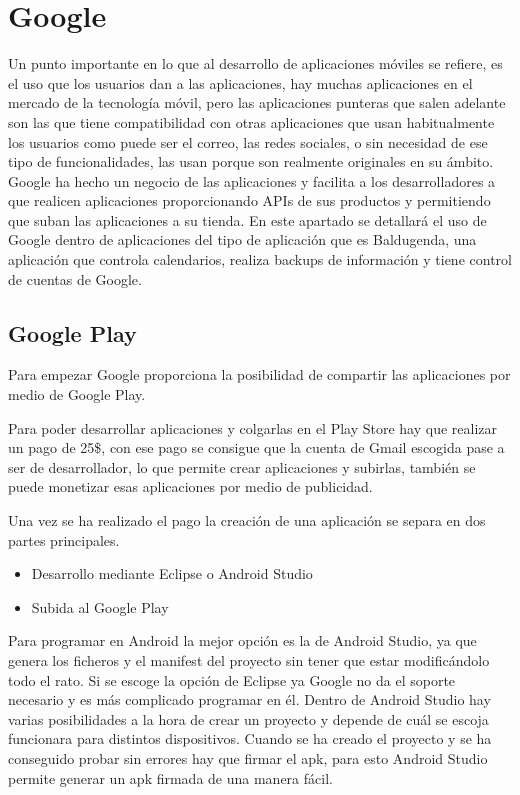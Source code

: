 \section{Google}
\label{secc:google}

Un punto importante en lo que al desarrollo de aplicaciones móviles se refiere, es el uso que los usuarios dan a las aplicaciones, hay muchas aplicaciones en el mercado de la tecnología móvil, pero las aplicaciones punteras que salen adelante son las que tiene compatibilidad con otras aplicaciones que usan habitualmente los usuarios como puede ser el correo, las redes sociales, o sin necesidad de ese tipo de funcionalidades, las usan porque son realmente originales en su ámbito.
Google ha hecho un negocio de las aplicaciones y facilita a los desarrolladores a que  realicen aplicaciones proporcionando APIs de sus productos y permitiendo que suban las aplicaciones a su tienda.
En este apartado se detallará el uso de Google dentro de aplicaciones del tipo de aplicación que es Baldugenda, una aplicación que controla calendarios, realiza backups de información  y tiene control de cuentas de Google.

\subsection{Google Play}
\label{subsecc:Google Play}

Para empezar Google proporciona la posibilidad de compartir  las aplicaciones por medio de Google Play.

Para poder desarrollar aplicaciones y colgarlas en el Play Store hay que realizar un pago de 25\$, con ese pago se consigue que la cuenta de Gmail escogida pase a ser de desarrollador, lo que permite crear aplicaciones y subirlas, también se puede monetizar esas aplicaciones por medio de publicidad.

Una vez se ha realizado el pago la creación de una aplicación se separa en dos partes principales.

\begin{itemize}
\item Desarrollo mediante Eclipse o Android Studio
\item Subida al Google Play
\end{itemize}

Para programar en Android la mejor opción es la de Android Studio, ya que genera los ficheros y el manifest del proyecto sin tener que estar modificándolo todo el rato.
Si se escoge la opción de Eclipse ya Google no da el soporte necesario y es más complicado programar en él.
Dentro de Android Studio hay varias posibilidades a la hora de crear un proyecto y depende de cuál se escoja funcionara para distintos dispositivos.
Cuando se ha creado el proyecto y se ha conseguido probar sin errores hay que firmar el apk, para esto Android Studio permite generar un apk firmada de una manera fácil.


